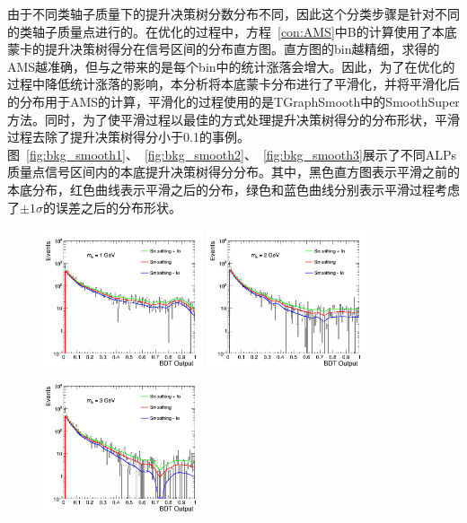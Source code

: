 由于不同类轴子质量下的提升决策树分数分布不同，因此这个分类步骤是针对不同的类轴子质量点进行的。在优化的过程中，方程~\ref{con:AMS}中B的计算使用了本底蒙卡的提升决策树得分在信号区间的分布直方图。直方图的bin越精细，求得的AMS越准确，但与之带来的是每个bin中的统计涨落会增大。因此，为了在优化的过程中降低统计涨落的影响，本分析将本底蒙卡分布进行了平滑化，并将平滑化后的分布用于AMS的计算，平滑化的过程使用的是TGraphSmooth中的SmoothSuper方法。同时，为了使平滑过程以最佳的方式处理提升决策树得分的分布形状，平滑过程去除了提升决策树得分小于0.1的事例。图~\ref{fig:bkg_smooth1}、~\ref{fig:bkg_smooth2}、~\ref{fig:bkg_smooth3}展示了不同ALPs质量点信号区间内的本底提升决策树得分分布。其中，黑色直方图表示平滑之前的本底分布，红色曲线表示平滑之后的分布，绿色和蓝色曲线分别表示平滑过程考虑了$\pm1\sigma$的误差之后的分布形状。

\begin{figure}[htbp]
  \begin{center}
		\includegraphics[width=0.42\textwidth]{figures/chapter04/bkg_smooth/M1_all_DYJetsToLL_SR.png}
        \includegraphics[width=0.42\textwidth]{figures/chapter04/bkg_smooth/M2_all_DYJetsToLL_SR.png} \\
		\includegraphics[width=0.42\textwidth]{figures/chapter04/bkg_smooth/M3_all_DYJetsToLL_SR.png}

\end{center}
\end{figure}
